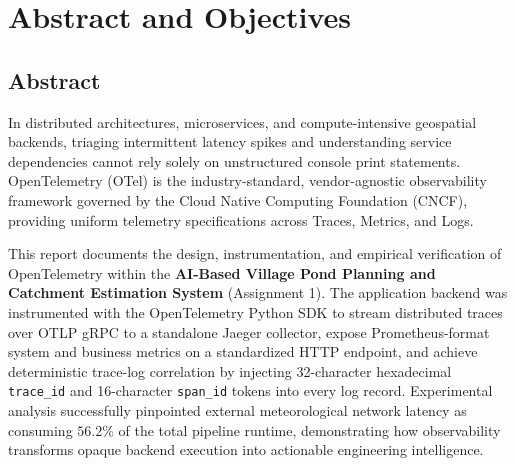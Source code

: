 \documentclass[11pt,a4paper]{article}
\begin{document}
\newpage
\tableofcontents
\newpage

\section{Abstract and Objectives}

\subsection{Abstract}
In distributed architectures, microservices, and compute-intensive geospatial backends, triaging intermittent latency spikes and understanding service dependencies cannot rely solely on unstructured console print statements. OpenTelemetry (OTel) is the industry-standard, vendor-agnostic observability framework governed by the Cloud Native Computing Foundation (CNCF), providing uniform telemetry specifications across Traces, Metrics, and Logs. 

This report documents the design, instrumentation, and empirical verification of OpenTelemetry within the \textbf{AI-Based Village Pond Planning and Catchment Estimation System} (Assignment 1). The application backend was instrumented with the OpenTelemetry Python SDK to stream distributed traces over OTLP gRPC to a standalone Jaeger collector, expose Prometheus-format system and business metrics on a standardized HTTP endpoint, and achieve deterministic trace-log correlation by injecting 32-character hexadecimal \texttt{trace\_id} and 16-character \texttt{span\_id} tokens into every log record. Experimental analysis successfully pinpointed external meteorological network latency as consuming $56.2\%$ of the total pipeline runtime, demonstrating how observability transforms opaque backend execution into actionable engineering intelligence.
\end{document}
